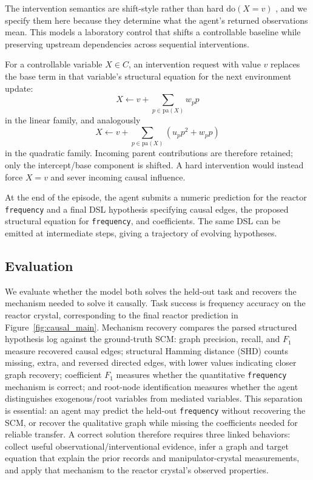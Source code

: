 The intervention semantics are shift-style rather than hard
\(\mathrm{do}(X{=}v)\) \citep{backshift2015}, and we specify them here because
they determine what the agent's returned observations mean.
This models a laboratory control that shifts a controllable baseline while preserving upstream dependencies across sequential interventions.

For a controllable
variable \(X\in C\), an intervention request with value \(v\) replaces the
base term in that variable's structural equation for the next environment
update:
\[
X \leftarrow v + \sum_{p \in \mathrm{pa}(X)} w_p p
\]
in the linear family, and analogously
\[
X \leftarrow v + \sum_{p \in \mathrm{pa}(X)} (u_p p^2 + w_p p)
\]
in the quadratic family. Incoming parent contributions are therefore retained;
only the intercept/base component is shifted. A hard intervention would instead
force \(X=v\) and sever incoming causal influence.

At the end of the episode, the agent submits a numeric prediction for the
reactor \texttt{frequency} and a final DSL hypothesis specifying causal edges,
the proposed structural equation for \texttt{frequency}, and coefficients. The
same DSL can be emitted at intermediate steps, giving a trajectory of evolving
hypotheses.

\subsection{Evaluation}
\label{sec:eval-targets}

We evaluate whether the model both solves the held-out task and recovers the
mechanism needed to solve it causally. Task success is frequency accuracy on
the reactor crystal, corresponding to the final reactor prediction in
Figure~\ref{fig:causal_main}.
Mechanism recovery compares the parsed structured hypothesis log
against the ground-truth SCM: graph precision, recall, and \(F_1\) measure
recovered causal edges; structural Hamming distance (SHD) counts missing,
extra, and reversed directed edges, with lower values indicating closer graph
recovery; coefficient \(F_1\) measures whether the quantitative
\texttt{frequency} mechanism is correct; and root-node identification measures
whether the agent distinguishes exogenous/root variables from mediated
variables. This separation is essential: an agent may predict the held-out
\texttt{frequency} without recovering the SCM, or recover the qualitative graph
while missing the coefficients needed for reliable transfer.
A correct solution therefore requires three linked behaviors: collect useful
observational/interventional evidence, infer a graph and target equation that
explain the prior records and manipulator-crystal measurements, and apply that mechanism to the reactor
crystal's observed properties.
